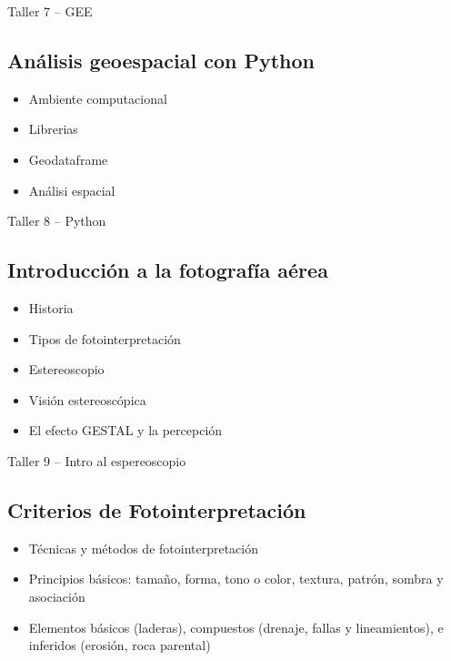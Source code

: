 \documentclass[a4paper,twoside,11pt,]{article}
\begin{document}
\begin{tcolorbox}[enhanced,width=5in,center upper,  fontupper=\large\bfseries,drop shadow southwest,sharp corners]
Taller 7 -- GEE
\end{tcolorbox}

\subsection {Análisis geoespacial con Python}
\begin{itemize}
\item Ambiente computacional
\item Librerias
\item Geodataframe
\item Análisi espacial
\end{itemize}

\begin{tcolorbox}[enhanced,width=5in,center upper,  fontupper=\large\bfseries,drop shadow southwest,sharp corners]
Taller 8 -- Python
\end{tcolorbox}

\subsection {Introducción a la fotografía aérea}
\begin{itemize}
\item Historia
\item Tipos de fotointerpretación
\item Estereoscopio
\item Visión estereoscópica
\item El efecto GESTAL y la percepción
\end{itemize}

\begin{tcolorbox}[enhanced,width=5in,center upper,  fontupper=\large\bfseries,drop shadow southwest,sharp corners]
Taller 9 -- Intro al espereoscopio
\end{tcolorbox}

\subsection {Criterios de Fotointerpretación}
\begin{itemize}
\item Técnicas y métodos de fotointerpretación 
\item Principios básicos: tamaño, forma, tono o color, textura, patrón, sombra y asociación
\item Elementos básicos (laderas), compuestos (drenaje, fallas y lineamientos), e inferidos (erosión, roca parental)
\end{itemize}
\end{document}
